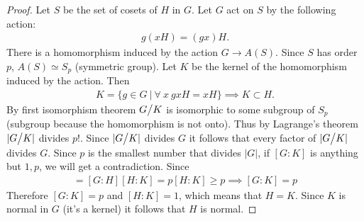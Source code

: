 \begin{proof}
  Let $S$ be the set of cosets of $H$ in $G$. Let $G$ act on $S$ by the following action:
  \begin{align*}
    g(xH) = (gx)H.
  \end{align*}
  There is a homomorphism induced by the action $G\to A(S)$. Since $S$ has order $p$, $A(S) \simeq S_p$ (symmetric group). Let $K$ be the kernel of the homomorphism induced by the action. Then
  \begin{align*}
    K = \{g\in G\ |\ \forall\ x\ gxH = xH\}  \implies K\subset H.
  \end{align*}
  By first isomorphism theorem $G\bign/K$ is isomorphic to some subgroup of $S_p$ (subgroup because the homomorphism is not onto). Thus by Lagrange's theorem $|G\bign/K|$ divides $p!$. Since $|G\bign/ K|$ divides $G$ it follows that every factor of $|G\bign/K|$ divides $G$. Since $p$ is the smallest number that divides $|G|$, if $[G:K]$ is anything but $1,p$, we will get a contradiction. Since
  \begin{align*}
    [G:K] = [G:H][H:K] = p[H:K] \geq p \implies [G:K] = p
  \end{align*}
  Therefore $[G:K] = p$ and $[H:K] = 1$, which means that $H=K$. Since $K$ is normal in $G$ (it's a kernel) it follows that $H$ is normal.
\end{proof}

